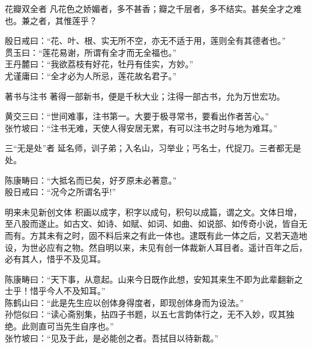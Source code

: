 \begin{yulu}{花瓣双全者}
凡花色之娇媚者，多不甚香；瓣之千层者，多不结实。甚矣全才之难也。兼之者，其惟莲乎？
\begin{comments}
殷日戒曰：“花、叶、根、实无所不空，亦无不适于用，莲则全有其德者也。” \\
贯玉曰：“莲花易谢，所谓有全才而无全福也。” \\
王丹麓曰：“我欲荔枝有好花，牡丹有佳实，方妙。” \\
尤谨庸曰：“全才必为人所忌，莲花故名君子。”
\end{comments}
\end{yulu}

\begin{yulu}{著书与注书}
著得一部新书，便是千秋大业；注得一部古书，允为万世宏功。
\begin{comments}
黄交三曰：“世间难事，注书第一。大要于极寻常书，要看出作者苦心。” \\
张竹坡曰：“注书无难，天使人得安居无累，有可以注书之时与地为难耳。”
\end{comments}
\end{yulu}

\begin{yulu}{三“无是处”者}
延名师，训子弟；入名山，习举业；丐名士，代捉刀。三者都无是处。
\begin{comments}
陈康畴曰：“大抵名而已矣，好歹原未必著意。” \\
殷日戒曰：“况今之所谓名乎!”
\end{comments}
\end{yulu}

\begin{yulu}{明来未见新创文体}
积画以成字，积字以成句，积句以成篇，谓之文。文体日增，至八股而遂止。如古文、如诗、如赋、如词、如曲、如说部、如传奇小说，皆自无而有。方其未有之时，固不料后来之有此一体也。逮既有此一体之后，又若天造地设，为世必应有之物。然自明以来，未见有创一体裁新人耳目者。遥计百年之后，必有其人，惜乎不及见耳。
\begin{comments}
陈康畴曰：“天下事，从意起。山来今日既作此想，安知其来生不即为此辈翻新之士乎！惜乎今人不及知耳。” \\
陈鹤山曰：“此是先生应以创体身得度者，即现创体身而为设法。” \\
孙恺似曰：“读心斋别集，拈四子书题，以五七言韵体行之，无不入妙，叹其独绝。此则直可当先生自序也。” \\
张竹坡曰：“见及于此，是必能创之者。吾拭目以待新裁。”
\end{comments}
\end{yulu}

